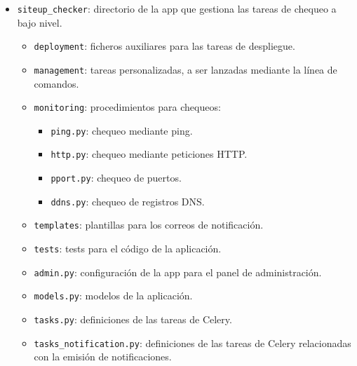 \begin{itemize}
\item \texttt{siteup\_checker}: directorio de la app que gestiona las tareas de chequeo a bajo nivel.
  \begin{itemize}
  \item \texttt{deployment}: ficheros auxiliares para las tareas de despliegue.
  \item \texttt{management}: tareas personalizadas, a ser lanzadas mediante la línea de comandos.
  \item \texttt{monitoring}: procedimientos para chequeos:
    \begin{itemize}
    \item \texttt{ping.py}: chequeo mediante ping.
    \item \texttt{http.py}: chequeo mediante peticiones HTTP.
    \item \texttt{pport.py}: chequeo de puertos.
    \item \texttt{ddns.py}: chequeo de registros DNS.
    \end{itemize}
  \item \texttt{templates}: plantillas para los correos de notificación.
  \item \texttt{tests}: tests para el código de la aplicación.
  \item \texttt{admin.py}: configuración de la app para el panel de administración.
  \item \texttt{models.py}: modelos de la aplicación.
  \item \texttt{tasks.py}: definiciones de las tareas de Celery.
  \item \texttt{tasks\_notification.py}: definiciones de las tareas de Celery
    relacionadas con la emisión de notificaciones.
  \end{itemize}


\end{itemize}
